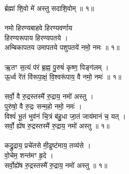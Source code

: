 र्ब्रह्मा॑ शि॒वो मे॑ अस्तु सदाशि॒वोम् ॥ १॥\\
\\
नमो हिरण्यबाहवे हिरण्यवर्णाय\\
हिरण्यरूपाय हिरण्यपतये ।\\
अम्बिकापतय उमापतये पशुपतये॑ नमो॒ नमः ॥ १॥\\
\\
ऋ॒तꣳ स॒त्यं प॑रं ब्र॒ह्म॒ पु॒रुषं॑ कृष्ण॒ पिङ्ग॑लम् ।\\
ऊ॒र्ध्व रे॑तं वि॑रूपा॒क्षं॒ वि॒श्वरू॑पाय॒ वै नमो॒ नमः॑ ॥ १॥\\
\\
सर्वो॒ वै रु॒द्रस्तस्मै॑ रु॒द्राय॒ नमो॑ अस्तु ।\\
पुरु॑षो॒ वै रु॒द्रः सन्म॒हो नमो॒ नमः॑ ।\\
विश्वं॑ भू॒तं भुव॑नं चि॒त्रं ब॑हु॒धा जा॒तं जाय॑मानं च॒ यत् ।\\
सर्वो॒ ह्ये॑ष रु॒द्रस्तस्मै॑ रु॒द्राय॒ नमो॑ अस्तु ॥ १॥\\
\\
कद्रु॒द्राय॒ प्रचे॑तसे मी॒ढुष्ट॑माय॒ तव्य॑से ।\\
वो॒चेम॒ शन्त॑मꣳ हृ॒दे ।\\
सर्वो॒ह्ये॑ष रु॒द्रस्तस्मै॑ रु॒द्राय॒ नमो॑ अस्तु ॥ १॥\\
